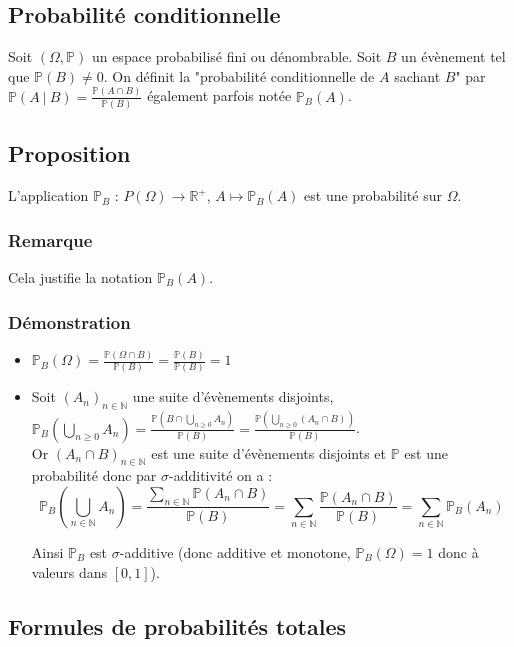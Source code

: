 \documentclass[a4paper,10pt]{book} %
\newcommand{\R}{\mathbb{R}}
\newcommand{\N}{\mathbb{N}}
\renewcommand{\P}{\mathbb{P}} %
\newcommand{\tq}{~|~}
\begin{document}
\subsection{Probabilité conditionnelle}
Soit $(\Omega,\P)$ un espace probabilisé fini ou dénombrable. Soit $B$ un évènement tel que $\P(B)\neq 0$. On définit la "probabilité conditionnelle de $A$ sachant $B$" par $\P(A\tq B)=\frac{\P(A\cap B)}{\P(B)}$ également parfois notée $\P_B(A)$.

\subsection{Proposition}\label{proposition1.1.1}
L'application $\P_B$ : $P(\Omega)\rightarrow \R^+$, $A\mapsto \P_B(A)$ est une probabilité sur $\Omega$.

\subsubsection{Remarque}
Cela justifie la notation $\P_B(A)$.

\subsubsection{Démonstration}
\begin{itemize}
\item $\displaystyle \P_B(\Omega)=\frac{\P(\Omega\cap B)}{\P(B)}=\frac{\P(B)}{\P(B)}=1$
\item Soit $(A_n)_{n\in\N}$ une suite d'évènements disjoints, $\displaystyle \P_B(\bigcup_{n\geq 0}A_n)=\frac{\P(B\cap\bigcup_{n\geq 0}A_n)}{\P(B)}=\frac{\P(\bigcup_{n\geq 0}(A_n\cap B))}{\P(B)}$.\\

Or $(A_n\cap B)_{n\in \N}$ est une suite d'évènements disjoints et $\P$ est une probabilité donc par $\sigma$-additivité on a :\\
$$\P_B(\bigcup_{n\in\N} A_n)=\frac{\sum_{n\in \N}\P(A_n\cap B)}{\P(B)}=\sum_{n\in \N}\frac{\P(A_n\cap B)}{\P(B)}=\sum_{n\in \N}\P_B(A_n)$$

Ainsi $\P_B$ est $\sigma$-additive (donc additive et monotone, $\P_B(\Omega)=1$ donc à valeurs dans $[0,1]$).
\end{itemize}

\newpage

\subsection{Formules de probabilités totales}
\end{document}
